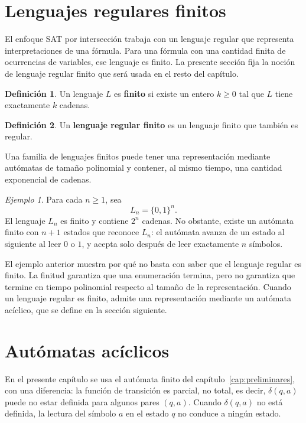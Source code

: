 \documentclass{report}
\theoremstyle{definition}
\newtheorem{definicion}{Definición}[chapter]
\theoremstyle{plain}
\theoremstyle{remark}
\newtheorem{ejemplo}{Ejemplo}[chapter]
\begin{document}
\section{Lenguajes regulares finitos}
\label{sec:lenguajes-regulares-finitos}

El enfoque SAT por intersección trabaja con un lenguaje regular que
representa interpretaciones de una fórmula. Para una fórmula con una
cantidad finita de ocurrencias de variables, ese lenguaje es finito. La presente
sección fija la noción de lenguaje regular finito que será usada en el
resto del capítulo.

\begin{definicion}
Un lenguaje $L$ es \textbf{finito} si existe un entero $k \ge 0$ tal
que $L$ tiene exactamente $k$ cadenas.
\end{definicion}

\begin{definicion}
Un \textbf{lenguaje regular finito} es un lenguaje finito que también
es regular.
\end{definicion}

Una familia de lenguajes finitos puede tener
una representación mediante autómatas de tamaño polinomial y contener,
al mismo tiempo, una cantidad exponencial de cadenas.

\begin{ejemplo}
\label{ej:Ln}
Para cada $n \ge 1$, sea
\[
  L_n = \{0,1\}^n.
\]
El lenguaje $L_n$ es finito y contiene $2^n$ cadenas. No obstante,
existe un autómata finito con $n+1$ estados que reconoce
$L_n$: el autómata avanza de un estado al siguiente al leer $0$ o $1$, y
acepta solo después de leer exactamente $n$ símbolos.
\end{ejemplo}

El ejemplo anterior muestra por qué no basta con saber que el lenguaje
regular es finito. La finitud garantiza que una enumeración termina, pero
no garantiza que termine en tiempo polinomial respecto al tamaño de la
representación. Cuando un lenguaje regular es finito, admite una
representación mediante un autómata acíclico, que se define en la
sección siguiente.

\section{Autómatas acíclicos}
\label{sec:automatas-aciclicos}

En el presente capítulo se usa el autómata finito del
capítulo~\ref{cap:preliminares}, con una diferencia: la función de
transición es parcial, no total, es decir, $\delta(q,a)$ puede no estar
definida para algunos pares $(q,a)$. Cuando $\delta(q,a)$ no está
definida, la lectura del símbolo $a$ en el estado $q$ no conduce a
ningún estado.
\end{document}
